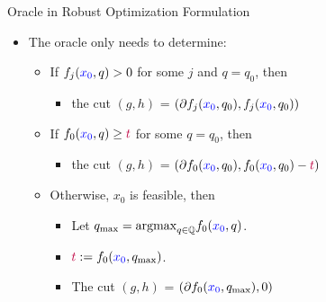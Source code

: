 \documentclass[10pt,ignorenonframetext,serif,onlymath]{beamer}
\providecommand{\tightlist}{%
  \setlength{\itemsep}{0pt}\setlength{\parskip}{0pt}}
\begin{document}
\begin{frame}{Oracle in Robust Optimization Formulation}
\protect\hypertarget{oracle-in-robust-optimization-formulation}{}

\begin{itemize}
\tightlist
\item
  The oracle only needs to determine:

  \begin{itemize}
  \tightlist
  \item
    If \(f_j({\color{blue}x_0}, q) > 0\) for some \(j\) and \(q = q_0\),
    then

    \begin{itemize}
    \tightlist
    \item
      the cut \((g, h)\) =
      \((\partial f_j({\color{blue}x_0}, q_0), f_j({\color{blue}x_0}, q_0))\)
    \end{itemize}
  \item
    If \(f_0({\color{blue}x_0}, q) \geq {\color{purple}t}\) for some
    \(q = q_0\), then

    \begin{itemize}
    \tightlist
    \item
      the cut \((g, h)\) =
      \((\partial f_0({\color{blue}x_0}, q_0), f_0({\color{blue}x_0}, q_0) - {\color{purple}t})\)
    \end{itemize}
  \item
    Otherwise, \(x_0\) is feasible, then

    \begin{itemize}
    \tightlist
    \item
      Let
      \(q_{\max} = \text{argmax}_{q \in \mathbb Q} f_0({\color{blue}x_0}, q)\).
    \item
      \({\color{purple}t} := f_0({\color{blue}x_0}, q_{\max})\).
    \item
      The cut \((g, h)\) =
      \((\partial f_0({\color{blue}x_0}, q_{\max}), 0)\)
    \end{itemize}
  \end{itemize}
\end{itemize}

\end{frame}
\end{document}
